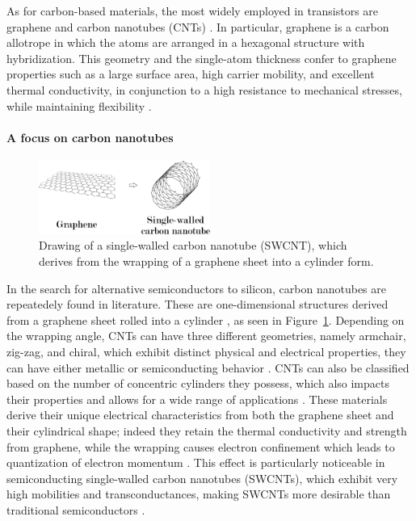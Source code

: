 As for carbon-based materials, the most widely employed in transistors are graphene \citep{krsihnaRecent2021, moonGraphene2012, reddyGraphene2011} and carbon nanotubes (CNTs) \citep{kumarCarbon2023, maqboolReview2024, shkodraElectrolytegated2021}. In particular, graphene is a carbon allotrope in which the atoms are arranged in a hexagonal structure with  hybridization. This geometry and the single-atom thickness confer to graphene properties such as a large surface area, high carrier mobility, and excellent thermal conductivity, in conjunction to a high resistance to mechanical stresses, while maintaining flexibility \citep{farjadianRecent2020, radsarGraphene2021, uradeGraphene2023}.

\paragraph{A focus on carbon nanotubes}
\begin{figure}[h]
    \centering
    \includegraphics[width=0.5\textwidth]{figures/chapter1/fet/Fig4_cntStructure.pdf}
    \caption{Drawing of a single-walled carbon nanotube (SWCNT), which derives from the wrapping of a graphene sheet into a cylinder form.}
    \label{fig:cntStructure}
\end{figure}

In the search for alternative semiconductors to silicon, carbon nanotubes are repeatedely found in literature. These are one-dimensional structures derived from a graphene sheet rolled into a cylinder \citep{iijimaHelical1991}, as seen in Figure~\ref{fig:cntStructure}. Depending on the wrapping angle, CNTs can have three different geometries, namely armchair, zig-zag, and chiral, which exhibit distinct physical and electrical properties, \eg{} they can have either metallic or semiconducting behavior \citep{dresselhausChapter1996, avourisMolecular2002, popovCarbon2004}. CNTs can also be classified based on the number of concentric cylinders they possess, which also impacts their properties and allows for a wide range of applications \citep{popovCarbon2004}. These materials derive their unique electrical characteristics from both the graphene sheet and their cylindrical shape; indeed they retain the thermal conductivity and strength from graphene, while the wrapping causes electron confinement which leads to quantization of electron momentum \citep{avourisMolecular2002, mceuenSinglewalled2002}. This effect is particularly noticeable in semiconducting single-walled carbon nanotubes (SWCNTs), which exhibit very high mobilities and transconductances, making SWCNTs more desirable than traditional semiconductors \citep{mceuenElectron2004}. 
